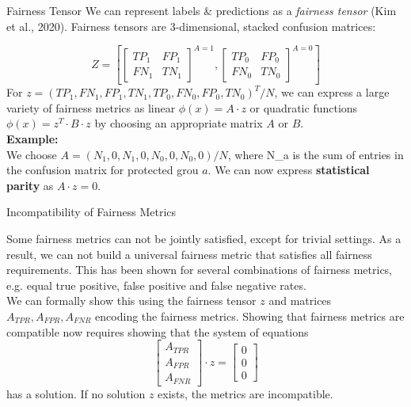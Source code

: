 \documentclass[11pt,compress,t,notes=noshow, xcolor=table]{beamer}
\begin{document}
\begin{vbframe}{Fairness Tensor}
  We can represent labels \& predictions as a \emph{fairness tensor} (Kim et al., 2020).
  Fairness tensors are 3-dimensional, stacked confusion matrices:

  \[
  Z = \left[
    \begin{bmatrix}
    TP_1  & FP_1 \\
    FN_1  & TN_1
    \end{bmatrix} ^{A=1}
    ,
    \begin{bmatrix}
      TP_0  & FP_0 \\
      FN_0  & TN_0
    \end{bmatrix} ^{A=0} 
    \right]
  \]
  \vspace{.2cm}
  For $z = (TP_1,FN_1,FP_1,TN_1,TP_0,FN_0,FP_0,TN_0)^T / N$, we can express a large variety of fairness metrics as 
  linear $\phi(x) = A \cdot z$ or quadratic functions $\phi(x) = z^T \cdot B \cdot z$ by choosing an appropriate matrix $A$ or $B$. \\
  \vspace{.2cm}
  \textbf{Example:} \\ We choose $A = (N_1, 0, N_1, 0, N_0, 0, N_0, 0) / N$, where N_{a} is the sum of entries in the confusion matrix for protected grou $a$.
  We can now express \textbf{statistical parity} as $A \cdot z = 0$.
\end{vbframe}
\begin{vbframe}{Incompatibility of Fairness Metrics}

  Some fairness metrics can not be jointly satisfied, except for trivial settings.
  As a result, we can not build a universal fairness metric that satisfies all fairness requirements.
  This has been shown for several combinations of fairness metrics, e.g. equal true positive, false positive and false negative rates.\\
  \vspace{.2cm}
  We can formally show this using the fairness tensor $z$ and matrices $A_{TPR}, A_{FPR}, A_{FNR}$ encoding the fairness metrics.
  Showing that fairness metrics are compatible now requires showing that the system of equations 
  \[ \begin{bmatrix} A_{TPR} \\ A_{FPR} \\ A_{FNR} \end{bmatrix} \cdot z  = \begin{bmatrix} 0 \\ 0 \\ 0 \end{bmatrix} \]
  has a solution. If no solution $z$ exists, the metrics are incompatible.

\end{vbframe}
\end{document}
